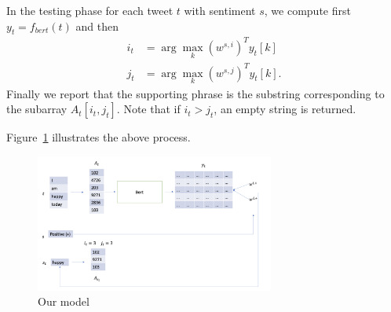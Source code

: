 In the testing phase for each tweet $t$ with sentiment $s$, we compute first $y_t = f_{bert}(t)$ and then 
\begin{align*}
	i_{t} &= \arg\max_{k} (w^{s, i})^T y_t[k] \\
	j_{t} &= \arg\max_{k} (w^{s, j})^T y_t[k].
\end{align*}
Finally we report that the supporting phrase is the substring corresponding to the subarray $A_t[i_{t}, j_{t}]$. Note that if $i_{t} > j_{t}$, an empty string is returned.

 Figure~\ref{fig:model} illustrates the above process.

\begin{figure}[!h]
	\centering
	\includegraphics[width=0.7\textwidth,keepaspectratio]{model}
	\caption{Our model}
	\label{fig:model}
\end{figure}